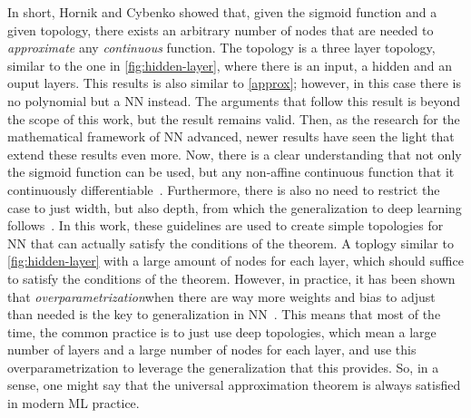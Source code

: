 In short, Hornik and Cybenko showed that, given the sigmoid function and a given topology, 
there exists an arbitrary number of nodes that are needed to \emph{approximate} any 
\emph{continuous} function. The topology is a three layer topology, similar to the one in 
\autoref{fig:hidden-layer}, where there is an input, a hidden and an ouput layers. This 
results is also similar to \autoref{approx}; however, in this case there is no polynomial 
but a NN instead. The arguments that follow this result is beyond the scope of this work, 
but the result remains valid. Then, as the research for the mathematical framework of NN 
advanced, newer results have seen the light that extend these results even more. Now, there 
is a clear understanding that not only the sigmoid function can be used, but any non-affine 
continuous function that it continuously differentiable~\cite{parkMinimumWidthUniversal2020}. Furthermore, there is also no need to restrict the case to just width, but also depth, 
from which the generalization to deep learning 
follows~\cite{zhouUniversalityDeepConvolutional2020,bernerModernMathematicsDeep2021}.
In this work, these guidelines are used to create simple topologies for NN that can 
actually satisfy the conditions of the theorem. A toplogy similar to 
\autoref{fig:hidden-layer} with a large amount of nodes for each layer, which should 
suffice to satisfy the conditions of the theorem. However, in practice, it has been shown 
that \emph{overparametrization}\textemdash when there are way more weights and bias to adjust than needed \textemdash is the key to generalization in 
NN~\cite{neyshaburRoleOverparametrizationGeneralization2018,cohenLearningCurvesOverparametrized2021}.
This means that most of the time, the common practice is to just use deep topologies, which 
mean a large number of layers and a large number of nodes for each layer, and use this 
overparametrization to leverage the generalization that this provides. So, in a sense, one 
might say that the universal approximation theorem is always satisfied in modern ML practice.

